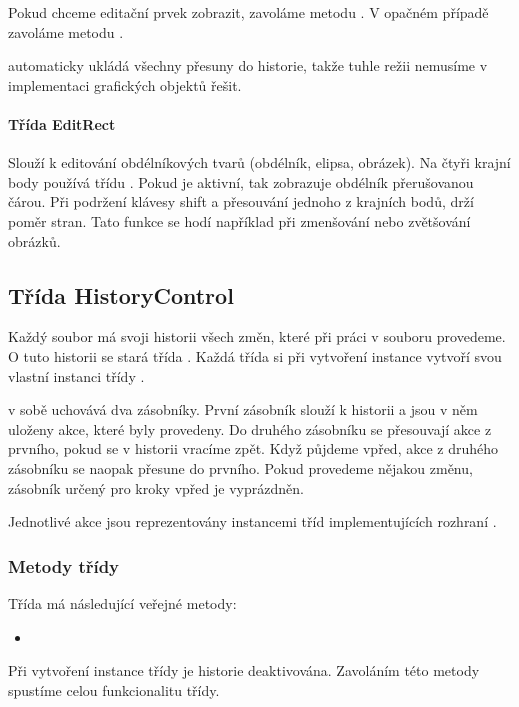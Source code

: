 \documentclass[
  field=inf,
  biblatex,
  glossaries,
  index
]{kidiplom}
\begin{document}
Pokud chceme editační prvek zobrazit, zavoláme metodu . V opačném případě zavoláme metodu .

 automaticky ukládá všechny přesuny do historie, takže tuhle režii nemusíme v implementaci grafických objektů řešit.

\paragraph{Třída EditRect}

Slouží k editování obdélníkových tvarů (obdélník, elipsa, obrázek). Na čtyři krajní body používá třídu . Pokud je aktivní, tak zobrazuje obdélník přerušovanou čárou. Při podržení klávesy shift a přesouvání jednoho z krajních bodů, drží poměr stran. Tato funkce se hodí například při zmenšování nebo zvětšování obrázků.

\subsection{Třída HistoryControl}

Každý soubor má svoji historii všech změn, které při práci v souboru provedeme. O tuto historii se stará třída . Každá třída  si při vytvoření instance vytvoří svou vlastní instanci třídy .

 v sobě uchovává dva zásobníky. První zásobník slouží k historii a jsou v něm uloženy akce, které byly provedeny. Do druhého zásobníku se přesouvají akce z prvního, pokud se v historii vracíme zpět. Když půjdeme vpřed, akce z druhého zásobníku se naopak přesune do prvního. Pokud provedeme nějakou změnu, zásobník určený pro kroky vpřed je vyprázdněn.

Jednotlivé akce jsou reprezentovány instancemi tříd implementujících rozhraní .

\subsubsection{Metody třídy}

Třída  má následující veřejné metody:

\begin{itemize}
\item {}
\end{itemize}
Při vytvoření instance třídy  je historie deaktivována. Zavoláním této metody spustíme celou funkcionalitu třídy.
\end{document}
